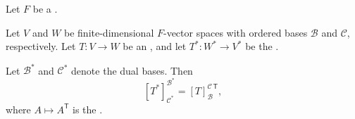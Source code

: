 \begin{proposition} \label{proposition:dual_map_is_transpose_of_matrix_representation}
    Let $F$ be a .

    Let $V$ and $W$ be finite-dimensional $F$-vector spaces with ordered bases $\mathcal{B}$ and $\mathcal{C}$, respectively. Let $T: V \to W$ be an , and let $T^*: W^* \to V^*$ be the .

    Let $\mathcal{B}^*$ and $\mathcal{C}^*$ denote the dual bases. Then
    $$[T^*]_{\mathcal{C}^*}^{\mathcal{B}^*} = [T]_{\mathcal{B}}^{\mathcal{C}\,\mathsf{T}},$$
    where $A \mapsto A^{\mathsf{T}}$ is the .
\end{proposition}
